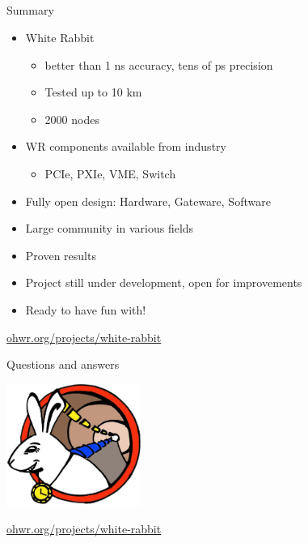 \documentclass[compress,red]{beamer}
\begin{document}
\subsection{}
\begin{frame}{Summary}


    \begin{itemize}
      \item White Rabbit
      \begin{itemize}
	\item better than 1 ns accuracy, tens of ps precision
	\item Tested up to 10 km
	\item 2000 nodes
      \end{itemize}
      \item WR components available from industry
      \begin{itemize}
	\item PCIe, PXIe, VME, Switch
      \end{itemize}
      \item Fully open design: Hardware, Gateware, Software
      \item Large community in various fields
      \item Proven results
      \item Project still under development, open for improvements
      \item Ready to have fun with!
    \end{itemize}    

\begin{center}
\href{http://ohwr.org/projects/white-rabbit}{ohwr.org/projects/white-rabbit}
\end{center}

 
\end{frame}
\begin{frame}{Questions and answers}

    \begin{center}
    \includegraphics[height=4.0cm]{logo/WRlogo.jpg}
    \end{center}

\begin{center}
\href{http://ohwr.org/projects/white-rabbit}{ohwr.org/projects/white-rabbit}
\end{center}
\end{frame}
\end{document}
